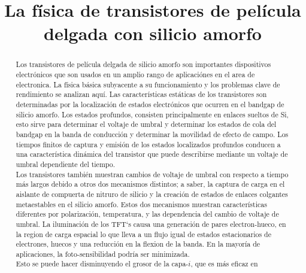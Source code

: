 \documentclass[conference]{IEEEtran}
\begin{document}
\title{La física de transistores de película delgada con silicio amorfo}

\author{
}

\maketitle

\begin{abstract}
    Los transistores de película delgada de silicio amorfo son importantes
    dispositivos electrónicos que son usados en un amplio rango de aplicaciónes
    en el area de electronica. La física básica subyacente a su funcionamiento
    y los problemas clave de rendimiento se analizan aquí. Las
    características estáticas de los transistores son determinadas por la localización
    de estados electrónicos que ocurren en el bandgap de silicio amorfo.
    Los estados profundos, consisten principalmente en enlaces sueltos de
    Si, esto sirve para determinar el voltaje de umbral y determinar los estados de cola
    del bandgap en la banda de conducción y determinar la movilidad de efecto de campo. 
    Los tiempos finitos de captura y emisión de los estados
    localizados profundos conducen a una característica dinámica del transistor
    que puede describirse mediante un voltaje de umbral dependiente del
    tiempo. 
    \\
    Los transistores también muestran cambios de voltaje de umbral
    con respecto a tiempo más largos debido a otros dos mecanismos distintos; 
    a saber, la captura de carga en el aislante de compuerta de nitruro de silicio y la
    creación de estados de enlaces colgantes metaestables en el silicio amorfo. Estos
    dos mecanismos muestran características diferentes por polarización,
    temperatura, y las dependencia del cambio de voltaje de umbral. La iluminación de 
    los TFT`s causa una generación de pares electron-hueco, en la
    region de carga espacial lo que lleva a un flujo igual de estados estacionarios
    de electrones, huecos y una reducción en la flexion de la banda. En la
    mayoría de aplicaciones, la foto-sensibilidad podría ser minimizada. 
    \\
    Esto se puede hacer disminuyendo el grosor de la capa-$i$, que es más eficaz en

\end{abstract}
\end{document}
